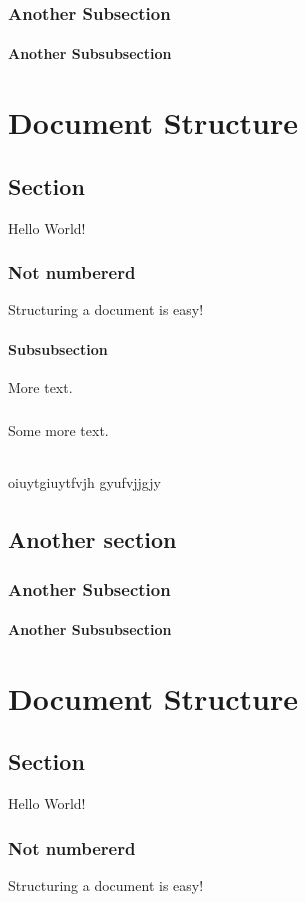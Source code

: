 \documentclass{book}
\begin{document}
	\subsection{Another Subsection}
	\subsubsection{Another Subsubsection}
	\lipsum[1-3]\chapter{Document Structure}
	\section{Section}
	Hello World!
	\subsection*{Not numbererd}
	Structuring a document is easy!
	\subsubsection{Subsubsection}
	More text.
	\paragraph{}
	Some more text.
	\subparagraph{}
	oiuytgiuytfvjh gyufvjjgjy
	
	\subparagraph{}
	\lipsum[1]
	\section{Another section}
	\subsection{Another Subsection}
	\subsubsection{Another Subsubsection}
	\lipsum[1-3]\chapter{Document Structure}
	\section{Section}
	Hello World!
	\subsection*{Not numbererd}
	Structuring a document is easy!
\end{document}
